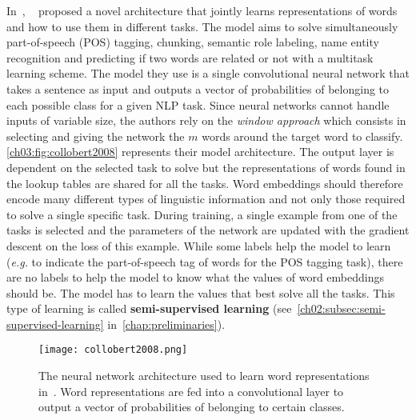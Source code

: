       In~\citeyear{collobert2008unified},
      \citeauthor{collobert2008unified}~\citep{collobert2008unified} proposed a
      novel architecture that jointly learns representations of words and how to
      use them in different tasks. The model aims to solve simultaneously
      part-of-speech (POS) tagging, chunking, semantic role labeling, name
      entity recognition and predicting if two words are related or not with a
      multitask learning scheme. The model they use is a single convolutional
      neural network that takes a sentence as input and outputs a vector of
      probabilities of belonging to each possible class for a given NLP task.
      Since neural networks cannot handle inputs of variable size, the authors
      rely on the \textit{window approach} which consists in selecting and
      giving the network the $m$ words around the target word to classify.
      \autoref{ch03:fig:collobert2008} represents their model architecture. The
      output layer is dependent on the selected task to solve but the
      representations of words found in the lookup tables are shared for all the
      tasks. Word embeddings should therefore encode many different types of
      linguistic information and not only those required to solve a single
      specific task. During training, a single example from one of the tasks is
      selected and the parameters of the network are updated with the gradient
      descent on the loss of this example. While some labels help the model to
      learn (\textit{e.g.} to indicate the part-of-speech tag of words for the
      POS tagging task), there are no labels to help the model to know what the
      values of word embeddings should be. The model has to learn the values
      that best solve all the tasks. This type of learning is called
      \textbf{semi-supervised learning}
      (see~\autoref{ch02:subsec:semi-supervised-learning}
      in~\autoref{chap:preliminaries}). \medskip

      \begin{figure}[h!]
        \centering
        \texttt{[image: collobert2008.png]}
        \caption[Neural network used to learn word embeddings by
        \citeauthor{collobert2008unified}.] {The neural network architecture
        used to learn word representations in~\citep{collobert2008unified}.
        Word representations are fed into a convolutional layer to output a
        vector of probabilities of belonging to certain classes.}
        \label{ch03:fig:collobert2008}
      \end{figure}

